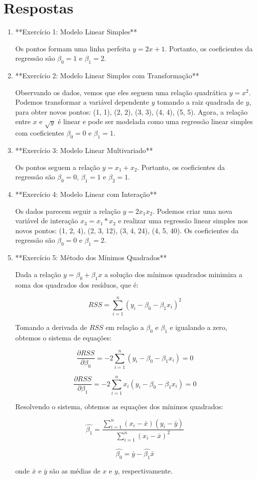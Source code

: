 \documentclass[12pt,a4paper, brazil]{article}
\begin{document}
\section{Respostas}

\begin{enumerate}
\item **Exercício 1: Modelo Linear Simples**

Os pontos formam uma linha perfeita $y = 2x + 1$. Portanto, os coeficientes da regressão são $\beta_0 = 1$ e $\beta_1 = 2$.

\item **Exercício 2: Modelo Linear Simples com Transformação**

Observando os dados, vemos que eles seguem uma relação quadrática $y = x^2$. Podemos transformar a variável dependente $y$ tomando a raiz quadrada de $y$, para obter novos pontos: (1, 1), (2, 2), (3, 3), (4, 4), (5, 5). Agora, a relação entre $x$ e $\sqrt{y}$ é linear e pode ser modelada como uma regressão linear simples com coeficientes $\beta_0 = 0$ e $\beta_1 = 1$.

\item **Exercício 3: Modelo Linear Multivariado**

Os pontos seguem a relação $y = x_1 + x_2$. Portanto, os coeficientes da regressão são $\beta_0 = 0$, $\beta_1 = 1$ e $\beta_2 = 1$.

\item **Exercício 4: Modelo Linear com Interação**

Os dados parecem seguir a relação $y = 2x_1x_2$. Podemos criar uma nova variável de interação $x_3 = x_1 * x_2$ e realizar uma regressão linear simples nos novos pontos: (1, 2, 4), (2, 3, 12), (3, 4, 24), (4, 5, 40). Os coeficientes da regressão são $\beta_0 = 0$ e $\beta_1 = 2$.

\item **Exercício 5: Método dos Mínimos Quadrados**

Dada a relação $y = \beta_0 + \beta_1x$ a solução dos mínimos quadrados minimiza a soma dos quadrados dos resíduos, que é:

$$
RSS = \sum_{i=1}^n (y_i - \beta_0 - \beta_1x_i)^2
$$

Tomando a derivada de $RSS$ em relação a $\beta_0$ e $\beta_1$ e igualando a zero, obtemos o sistema de equações:

$$
\frac{\partial RSS}{\partial \beta_0} = -2\sum_{i=1}^n (y_i - \beta_0 - \beta_1x_i) = 0
$$

$$
\frac{\partial RSS}{\partial \beta_1} = -2\sum_{i=1}^n x_i(y_i - \beta_0 - \beta_1x_i) = 0
$$

Resolvendo o sistema, obtemos as equações dos mínimos quadrados:

$$
\hat{\beta_1} = \frac{\sum_{i=1}^n (x_i - \bar{x})(y_i - \bar{y})}{\sum_{i=1}^n (x_i - \bar{x})^2}
$$

$$
\hat{\beta_0} = \bar{y} - \hat{\beta_1}\bar{x}
$$

onde $\bar{x}$ e $\bar{y}$ são as médias de $x$ e $y$, respectivamente.

\end{enumerate}


\printbibliography
\end{document}
